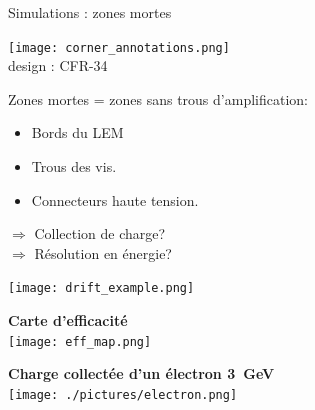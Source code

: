     \begin{frame}{Simulations : zones mortes}
       	\begin{scriptsize}
       		\begin{minipage}{0.38\textwidth}
       			\begin{center}
       				\texttt{[image: corner\_annotations.png]}\\
       				design : CFR-34\\
       			\end{center} 
       			Zones mortes = zones sans trous d'amplification:
       			\begin{itemize}
       				\item Bords du LEM
       				\item Trous des vis.
       				\item Connecteurs haute tension.
       			\end{itemize}
       			$\Rightarrow$ Collection de charge?\\
       			$\Rightarrow$ Résolution en énergie?\\
       		\end{minipage}
       		\begin{minipage}{0.58\textwidth}
       			\centering
       			\texttt{[image: drift\_example.png]}\\
       			\vspace{0.5cm} \hspace{0.1cm}
       			\begin{minipage}{0.48\textwidth}
       				\centering
       				\textbf{Carte d'efficacité}\\
       				\texttt{[image: eff\_map.png]}
       			\end{minipage}\hfill
       			\begin{minipage}{0.48\textwidth}
       				\centering
       				\textbf{Charge collectée d'un électron \SI{3}{\giga\eV}}\\
       				\texttt{[image: ./pictures/electron.png]}
       			\end{minipage}
       		\end{minipage}
       	\end{scriptsize} 
    \end{frame}

